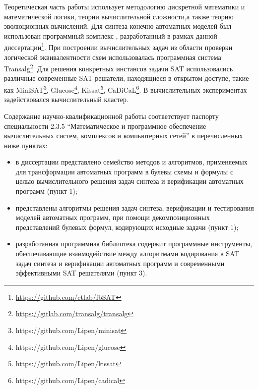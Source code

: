 \methods
%
Теоретическая часть работы использует методологию дискретной математики и математической логики, теории вычислительной сложности,а также теорию эволюционных вычислений.
Для синтеза конечно-автоматных моделей был использован программный комплекс , разработанный в рамках данной диссертации\footnote{\url{https://github.com/ctlab/fbSAT}}.
При построении вычислительных задач из области проверки логической эквивалентности схем использовалась программная система Transalg\footnote{\url{https://gitlab.com/transalg/transalg}}.
Для решения конкретных инстансов задачи SAT использовались различные современные SAT-решатели, находящиеся в открытом доступе, такие как MiniSAT\footnote{https://github.com/Lipen/minisat}, Glucose\footnote{https://github.com/Lipen/glucose}, Kissat\footnote{https://github.com/Lipen/kissat}, CaDiCaL\footnote{https://github.com/Lipen/cadical}.
В вычислительных экспериментах задействовался вычислительный кластер.


\relevance
%
Содержание научно-квалификационной работы соответствует паспорту специальности 2.3.5 \enquote{Математическое и программное обеспечение вычислительных систем, комплексов и компьютерных сетей} в перечисленных ниже пунктах:
\begin{itemize}[beginpenalty=10000]
    \item в диссертации представлено семейство методов и алгоритмов, применяемых для трансформации автоматных программ в булевы схемы и формулы с целью вычислительного решения задач синтеза и верификации автоматных программ (пункт 1);
    \item представлены алгоритмы решения задач синтеза, верификации и тестирования моделей автоматных программ, при помощи декомпозиционных представлений булевых формул, кодирующих исходные задачи (пункт 1);
    \item разработанная программная библиотека содержит программные инструменты, обеспечивающие взаимодействие между алгоритмами кодирования в SAT задач синтеза и верификации автоматных программ и современными эффективными SAT решателями (пункт 3).
\end{itemize}




